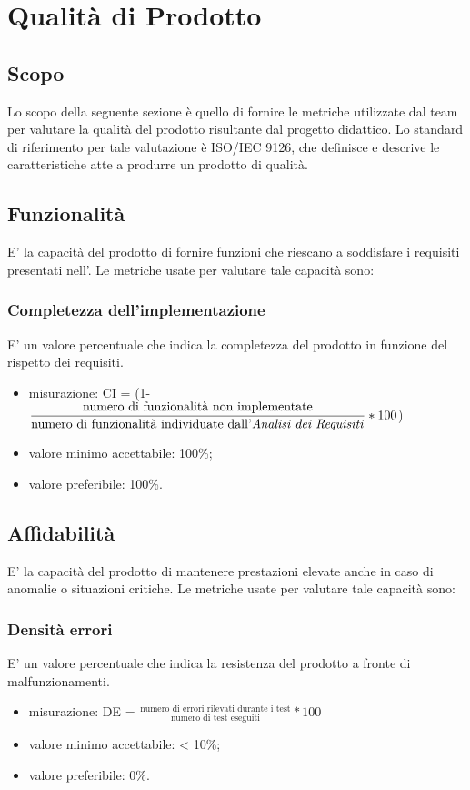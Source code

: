 \section{Qualità di Prodotto}
\subsection{Scopo}
Lo scopo della seguente sezione è quello di fornire le metriche utilizzate dal team \Gruppo{} per valutare la qualità del prodotto risultante dal progetto didattico. Lo standard di riferimento per tale valutazione è ISO/IEC 9126, che definisce e descrive le caratteristiche atte a produrre un prodotto di qualità.

\subsection{Funzionalità}
E' la capacità del prodotto di fornire funzioni che riescano a soddisfare i requisiti presentati nell'\AdR.
Le metriche usate per valutare tale capacità sono:

	\subsubsection*{Completezza dell'implementazione}
	E' un valore percentuale che indica la completezza del prodotto in funzione del rispetto dei requisiti.
	\begin{itemize}
	\item{misurazione: CI = (1-$\displaystyle\frac{\mbox{numero di funzionalità non implementate}}{\mbox{numero di funzionalità individuate dall'\textit{Analisi dei Requisiti}}}*100$)}
	\item {valore minimo accettabile: 100\%;}
	\item {valore preferibile: 100\%.}
	\end{itemize}
	
\subsection{Affidabilità}
E' la capacità del prodotto di mantenere prestazioni elevate anche in caso di anomalie o situazioni critiche.
Le metriche usate per valutare tale capacità sono:

	\subsubsection*{Densità errori}
	E' un valore percentuale che indica la resistenza del prodotto a fronte di malfunzionamenti.
	\begin{itemize}
		\item{misurazione: DE = $\displaystyle\frac{\mbox{numero di errori rilevati durante i test}}{\mbox{numero di test eseguiti}}*100$}
		\item {valore minimo accettabile: < 10\%;}
		\item {valore preferibile: 0\%.}
	\end{itemize}


